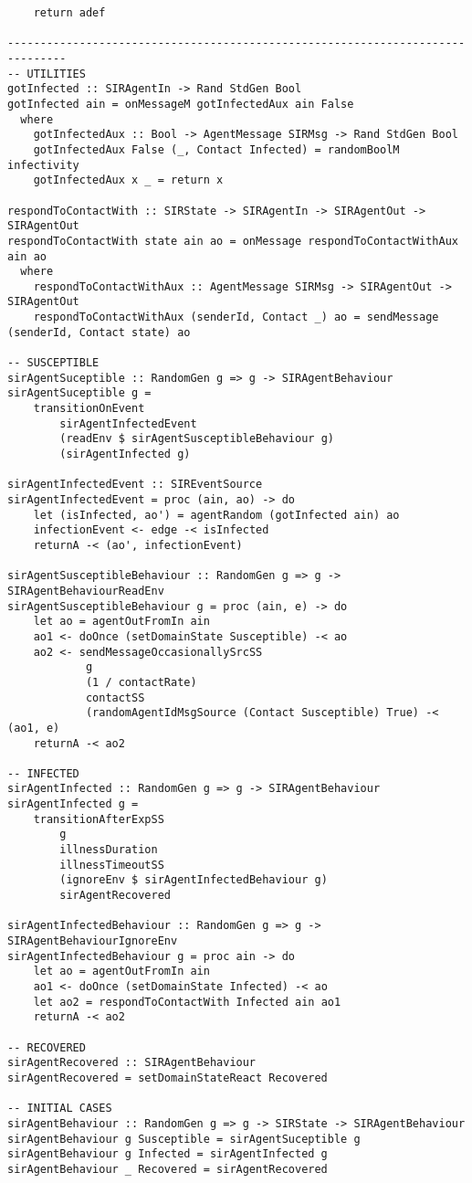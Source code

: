 \begin{verbatim}
    return adef
   
-------------------------------------------------------------------------------
-- UTILITIES
gotInfected :: SIRAgentIn -> Rand StdGen Bool
gotInfected ain = onMessageM gotInfectedAux ain False
  where
    gotInfectedAux :: Bool -> AgentMessage SIRMsg -> Rand StdGen Bool
    gotInfectedAux False (_, Contact Infected) = randomBoolM infectivity
    gotInfectedAux x _ = return x

respondToContactWith :: SIRState -> SIRAgentIn -> SIRAgentOut -> SIRAgentOut
respondToContactWith state ain ao = onMessage respondToContactWithAux ain ao
  where
    respondToContactWithAux :: AgentMessage SIRMsg -> SIRAgentOut -> SIRAgentOut
    respondToContactWithAux (senderId, Contact _) ao = sendMessage (senderId, Contact state) ao

-- SUSCEPTIBLE
sirAgentSuceptible :: RandomGen g => g -> SIRAgentBehaviour
sirAgentSuceptible g = 
	transitionOnEvent 
		sirAgentInfectedEvent 
		(readEnv $ sirAgentSusceptibleBehaviour g) 
		(sirAgentInfected g)

sirAgentInfectedEvent :: SIREventSource
sirAgentInfectedEvent = proc (ain, ao) -> do
    let (isInfected, ao') = agentRandom (gotInfected ain) ao
    infectionEvent <- edge -< isInfected
    returnA -< (ao', infectionEvent)

sirAgentSusceptibleBehaviour :: RandomGen g => g -> SIRAgentBehaviourReadEnv
sirAgentSusceptibleBehaviour g = proc (ain, e) -> do
    let ao = agentOutFromIn ain
    ao1 <- doOnce (setDomainState Susceptible) -< ao
    ao2 <- sendMessageOccasionallySrcSS 
    		g
    		(1 / contactRate)
    		contactSS
    		(randomAgentIdMsgSource (Contact Susceptible) True) -< (ao1, e)
    returnA -< ao2

-- INFECTED
sirAgentInfected :: RandomGen g => g -> SIRAgentBehaviour
sirAgentInfected g = 
	transitionAfterExpSS 
		g 
		illnessDuration 
		illnessTimeoutSS 
		(ignoreEnv $ sirAgentInfectedBehaviour g) 
		sirAgentRecovered

sirAgentInfectedBehaviour :: RandomGen g => g -> SIRAgentBehaviourIgnoreEnv
sirAgentInfectedBehaviour g = proc ain -> do
    let ao = agentOutFromIn ain
    ao1 <- doOnce (setDomainState Infected) -< ao
    let ao2 = respondToContactWith Infected ain ao1
    returnA -< ao2

-- RECOVERED
sirAgentRecovered :: SIRAgentBehaviour
sirAgentRecovered = setDomainStateReact Recovered

-- INITIAL CASES
sirAgentBehaviour :: RandomGen g => g -> SIRState -> SIRAgentBehaviour
sirAgentBehaviour g Susceptible = sirAgentSuceptible g
sirAgentBehaviour g Infected = sirAgentInfected g
sirAgentBehaviour _ Recovered = sirAgentRecovered


\end{verbatim}
